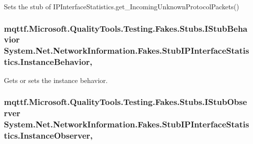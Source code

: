 Sets the stub of I\-P\-Interface\-Statistics.\-get\-\_\-\-Incoming\-Unknown\-Protocol\-Packets()

\hypertarget{class_system_1_1_net_1_1_network_information_1_1_fakes_1_1_stub_i_p_interface_statistics_a7eb72929e8ef6e3eb2112823ed7e4e82}{
\subsubsection[{Instance\-Behavior}]{\setlength{\rightskip}{0pt plus 5cm}mqttf.\-Microsoft.\-Quality\-Tools.\-Testing.\-Fakes.\-Stubs.\-I\-Stub\-Behavior System.\-Net.\-Network\-Information.\-Fakes.\-Stub\-I\-P\-Interface\-Statistics.\-Instance\-Behavior\hspace{0.3cm}{\ttfamily [get]}, {\ttfamily [set]}}}\label{class_system_1_1_net_1_1_network_information_1_1_fakes_1_1_stub_i_p_interface_statistics_a7eb72929e8ef6e3eb2112823ed7e4e82}


Gets or sets the instance behavior.

\hypertarget{class_system_1_1_net_1_1_network_information_1_1_fakes_1_1_stub_i_p_interface_statistics_a5d1953f2880610f14da02aa096a8dc2f}{
\subsubsection[{Instance\-Observer}]{\setlength{\rightskip}{0pt plus 5cm}mqttf.\-Microsoft.\-Quality\-Tools.\-Testing.\-Fakes.\-Stubs.\-I\-Stub\-Observer System.\-Net.\-Network\-Information.\-Fakes.\-Stub\-I\-P\-Interface\-Statistics.\-Instance\-Observer\hspace{0.3cm}{\ttfamily [get]}, {\ttfamily [set]}}}\label{class_system_1_1_net_1_1_network_information_1_1_fakes_1_1_stub_i_p_interface_statistics_a5d1953f2880610f14da02aa096a8dc2f}


